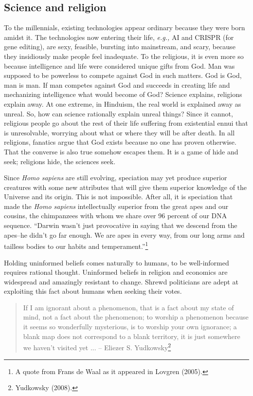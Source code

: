 \begin{multicols}{2}
\section{Science and religion}

To the millennials, existing technologies appear ordinary because they were born amidst it. The technologies now entering their life, \textit{e.g.,} AI and CRISPR (for gene editing), are sexy, feasible, bursting into mainstream, and scary, because they insidiously make people feel inadequate. To the religious, it is even more so because intelligence and life were considered unique gifts from God. Man was supposed to be powerless to compete against God in such matters. God is God, man is man. If man competes against God and succeeds in creating life and mechanizing intelligence what would become of God? Science explains, religions explain away. At one extreme, in Hinduism, the real world is explained away as unreal. So, how can science rationally explain unreal things? Since it cannot, religious people go about the rest of their life suffering from existential ennui that is unresolvable, worrying about what or where they will be after death. In all religions, fanatics argue that God exists because no one has proven otherwise. That the converse is also true somehow escapes them. It is a game of hide and seek; religions hide, the sciences seek.

Since \textit{Homo sapiens} are still evolving, speciation may yet produce superior creatures with some new attributes that will give them superior knowledge of the Universe and its origin. This is not impossible. After all, it is speciation that made the \textit{Homo sapiens} intellectually superior from the great apes and our cousins, the chimpanzees with whom we share over 96 percent of our DNA sequence. “Darwin wasn't just provocative in saying that we descend from the apes--he didn't go far enough. We are apes in every way, from our long arms and tailless bodies to our habits and temperament.”\footnote{A quote from Frans de Waal as it appeared in Lovgren (2005).}

Holding uninformed beliefs comes naturally to humans, to be well-informed requires rational thought. Uninformed beliefs in religion and economics are widespread and amazingly resistant to change. Shrewd politicians are adept at exploiting this fact about humans when seeking their votes.
\begin{quote}
If I am ignorant about a phenomenon, that is a fact about my state of mind, not a fact about the phenomenon; to worship a phenomenon because it seems so wonderfully mysterious, is to worship your own ignorance; a blank map does not correspond to a blank territory, it is just somewhere we haven't visited yet ... -- Eliezer S. Yudkowsky\footnote{Yudkowsky (2008).}
\end{quote}


\end{multicols}
